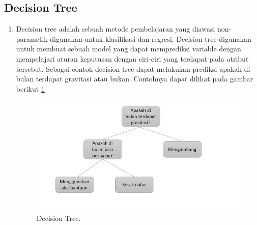 \subsection{Decision Tree}
\begin{enumerate}
\item Decision tree adalah sebuah metode pembelajaran yang diawasi non-parametik digunakan untuk klasifikasi dan regresi. Decision tree digunakan untuk membuat sebuah model yang dapat memprediksi variable dengan mempelajari aturan keputusan dengan ciri-ciri yang terdapat pada atribut tersebut. Sebagai contoh decision tree dapat melakukan prediksi apakah di bulan terdapat gravitasi atau bukan. Contohnya dapat dilihat pada gambar berikut \ref{DT}
		\begin{figure}[ht]
		\centerline{\includegraphics[width=1\textwidth]{figures/im/im66.png}}
		\caption{Decision Tree.}
		\label{DT}
		\end{figure}
\end{enumerate}

